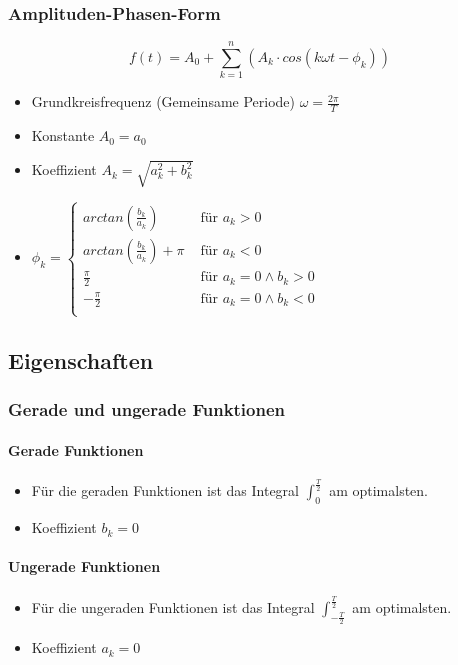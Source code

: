 \subsubsection{Amplituden-Phasen-Form}
\[
  f(t) = A_0 + \sum_{k=1}^{n}
  (A_k \cdot cos(k \omega t  - \phi_k))
\]
\begin{itemize}
  \item Grundkreisfrequenz (Gemeinsame Periode) $\omega = \frac{2\pi}{T}$
  \item Konstante $A_0 = a_0$
  \item Koeffizient $A_k = \sqrt{a_k^2 + b_k^2}$
  \item $\phi_k =  \begin{cases}
      arctan\left(\frac{b_k}{a_k}\right) & \text{ für } a_k > 0 \\
      arctan\left(\frac{b_k}{a_k}\right) + \pi & \text{ für } a_k < 0 \\
      \frac{\pi}{2} & \text{ für } a_k = 0 \wedge b_k > 0\\
      -\frac{\pi}{2} & \text{ für } a_k = 0 \wedge b_k < 0\\
    \end{cases}$
\end{itemize}

\subsection{Eigenschaften}
\subsubsection{Gerade und ungerade Funktionen}
\paragraph{Gerade Funktionen}
\begin{itemize}
  \item Für die geraden Funktionen ist das Integral
    $\int_0^{\frac{T}{2}}$ am optimalsten.
  \item Koeffizient $b_k = 0$
\end{itemize}
\paragraph{Ungerade Funktionen}
\begin{itemize}
  \item Für die ungeraden Funktionen ist das Integral
    $\int_{-\frac{T}{2}}^{\frac{T}{2}}$ am optimalsten.
  \item Koeffizient $a_k = 0$
\end{itemize}

